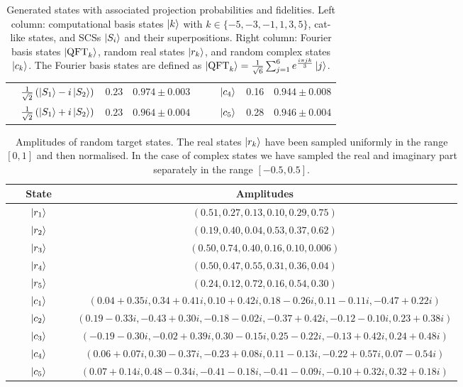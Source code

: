 \begin{table}[tbh]
\begin{tabular}{lcc|lcc}
$\quad\frac{1}{\sqrt{2}}\left(\ket{S_1}-i\ket{S_2}\right)$ & $0.23$ & $0.974 \pm 0.003\quad$&$\quad\ket{c_4}$ & 0.16 & $0.944\pm0.008$\\
$\quad\frac{1}{\sqrt{2}}\left(\ket{S_1}+i\ket{S_2}\right)$ & $0.23$ & $0.964 \pm 0.004\quad$& $\quad\ket{c_5}$ & 0.28 & $0.946\pm0.004$\\
\bottomrule
\end{tabular}
\caption{%
	Generated states with associated projection probabilities and fidelities.
	Left column: computational basis states $\ket k$ with $k\in\{-5,-3,-1,1,3,5\}$, cat-like states, and \acp{SCS} $\ket{S_i}$ and their superpositions.
	Right column: Fourier basis states $\ket{\operatorname{QFT}_k}$, random real states $\ket{r_k}$, and random complex states $\ket{c_k}$.
	The Fourier basis states are defined as $\ket{\operatorname{QFT}_k}=\frac{1}{\sqrt{6}}\sum_{j=1}^{6}e^{\frac{ i \pi jk }{3}}\ket{j}$.
}
\label{table:expQWs:summary}
\end{table}

\begin{table}[tbh]
\centering\footnotesize
\begin{tabular}{cc}
\toprule
State & Amplitudes \\
\midrule
$\qquad\ket{r_1}\qquad$& $\left( 0.51, 0.27, 0.13, 0.10, 0.29, 0.75\right)$\\
$\qquad\ket{r_2}\qquad$& $\left( 0.19, 0.40, 0.04, 0.53, 0.37, 0.62\right)$\\
$\qquad\ket{r_3}\qquad$&$\left( 0.50, 0.74, 0.40, 0.16, 0.10, 0.006\right)$ \\
$\qquad\ket{r_4}\qquad$& $\left( 0.50, 0.47, 0.55, 0.31, 0.36, 0.04\right)$ \\
$\qquad\ket{r_5}\qquad$& $\left( 0.24, 0.12, 0.72, 0.16, 0.54, 0.30\right)$ \\
$\qquad\ket{c_1}\qquad$& $\left( 0.04+0.35i, 0.34+0.41i, 0.10+0.42i, 0.18-0.26i, 0.11-0.11i, -0.47+0.22i\right)$  \\
$\qquad\ket{c_2}\qquad$& $\left( 0.19-0.33i, -0.43+0.30i, -0.18-0.02i, -0.37+0.42i, -0.12-0.10i, 0.23+0.38i\right)$\\
$\qquad\ket{c_3}\qquad$& $\left( -0.19-0.30i, -0.02+0.39i, 0.30-0.15i, 0.25-0.22i, -0.13+0.42i, 0.24+0.48i\right)$\\
$\qquad\ket{c_4}\qquad$& $\left( 0.06+0.07i, 0.30-0.37i, -0.23+0.08i, 0.11-0.13i, -0.22+0.57i, 0.07-0.54i\right)$\\
$\qquad\ket{c_5}\qquad$& $\left( 0.07+0.14i, 0.48-0.34i, -0.41-0.18i, -0.41-0.09i, -0.10+0.32i, 0.32+0.18i\right)$\\
\bottomrule
\end{tabular}
\caption{
	Amplitudes of random target states.
	The real states $\ket{r_k}$ have been sampled uniformly in the range $\left[0,1\right]$ and then normalised. In the case of complex states we have sampled the real and imaginary part separately in the range $\left[-0.5,0.5\right]$.
}
\label{table:expQWs:random_states_amps}
\end{table}

